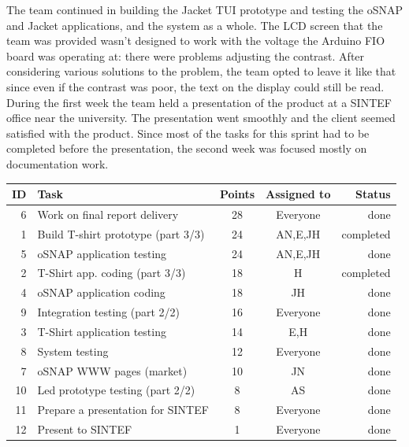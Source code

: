 The team continued in building the Jacket TUI prototype and testing
the oSNAP and Jacket applications, and the system as a whole.
The LCD screen that the team was provided wasn't designed to work with the
voltage the Arduino FIO board was operating at: there were problems adjusting
the contrast. After considering various solutions to the problem, the team
opted to leave it like that since even if the contrast was poor, the text on the
display could still be read. During the first week the team held a presentation
of the product at a SINTEF office near the university. The presentation went
smoothly and the client seemed satisfied with the product. Since most of the
tasks for this sprint had to be completed before the presentation, the second
week was focused mostly on documentation work.


\begin{table}[ht!]
\begin{tabular}{ | r | l | c | c | r | }

\hline
\textbf{ID} & \textbf{Task} & \textbf{Points} & \textbf{Assigned to} & \textbf{Status} \\
\hline

 6 & Work on final report delivery				& 28 & Everyone	& done \\
\hline
 1 & Build T-shirt prototype (part 3/3)			& 24 & AN,E,JH	& completed \\
\hline
 5 & oSNAP application testing					& 24 & AN,E,JH	& done \\
\hline
 2 & T-Shirt app. coding (part 3/3)				& 18 & H		& completed \\
\hline
 4 & oSNAP application coding					& 18 & JH		& done \\
\hline
 9 & Integration testing (part 2/2)				& 16 & Everyone	& done \\
\hline
 3 & T-Shirt application testing 				& 14 & E,H		& done \\
\hline
 8 & System testing								& 12 & Everyone	& done \\
\hline
 7 & oSNAP WWW pages (market)					& 10 & JN		& done \\
\hline
10 & Led prototype testing (part 2/2)			& 8  & AS		& done \\
\hline
11 & Prepare a presentation for SINTEF & 8  & Everyone       & done \\
\hline
12 & Present to SINTEF & 1  & Everyone       & done \\
\hline

\end{tabular}
\end{table}

